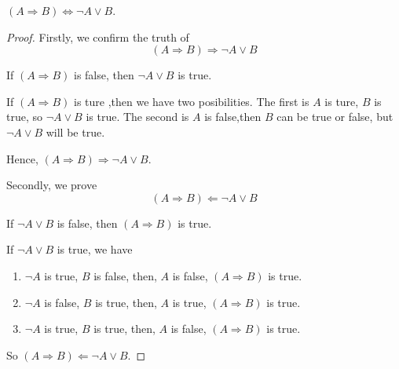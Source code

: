 \begin{question}
    $(A \Rightarrow B)\Leftrightarrow\lnot A \vee B$.
\end{question}
\begin{proof}
    Firstly, we confirm the truth of \[(A \Rightarrow B)\Rightarrow\lnot A \vee B\]

    If $(A \Rightarrow B)$ is false, then $\lnot A \vee B$ is true.

    If $(A \Rightarrow B)$ is ture ,then we have two posibilities. The first is $A$ is ture, $B$ is true, so $\lnot A \vee B$ is true. The second is $A$ is false,then $B$ can be true or false, but $\lnot A \vee B$ will be true.

    Hence, $(A \Rightarrow B)\Rightarrow\lnot A \vee B$.

    Secondly, we prove \[(A \Rightarrow B)\Leftarrow\lnot A \vee B\]

    If $\lnot A \vee B$ is false, then $(A \Rightarrow B)$ is true.

    If $\lnot A \vee B$ is true, we have
    \begin{enumerate}
        \item $\lnot A$ is true, $B$ is false, then, $A$ is false, $(A \Rightarrow B)$ is true.
        \item $\lnot A$ is false, $B$ is true, then, $A$ is true, $(A \Rightarrow B)$ is true.
        \item $\lnot A$ is true, $B$ is true, then, $A$ is false, $(A \Rightarrow B)$ is true.
    \end{enumerate}

    So $(A \Rightarrow B)\Leftarrow\lnot A \vee B$.
\end{proof}


